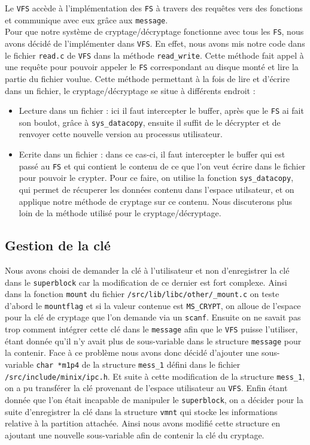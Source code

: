 \documentclass[10pt, onecolumn] {IEEEtran}
\begin{document}
Le \texttt{VFS} accède à l'implémentation des \texttt{FS} à travers des requêtes vers des fonctions et communique avec eux grâce aux \texttt{message}. \\

Pour que notre système de cryptage/décryptage fonctionne avec tous les \texttt{FS}, nous avons décidé de l'implémenter dans \texttt{VFS}. En effet, nous avons mis notre code dans le fichier \texttt{read.c} de \texttt{VFS} dans la méthode \texttt{read\_write}. Cette méthode fait appel à une requête pour pouvoir appeler le  \texttt{FS} correspondant au disque monté et lire la partie du fichier voulue. Cette méthode permettant à la fois de lire et d'écrire dans un fichier, le cryptage/décryptage se situe à différents endroit :

\begin{itemize}
\item Lecture dans un fichier : ici il faut intercepter le buffer, après que le \texttt{FS} ai fait son boulot, grâce à \texttt{sys\_datacopy}, ensuite il suffit de le décrypter et de renvoyer cette nouvelle version au processus utilisateur.
\item Ecrite dans un fichier : dans ce cas-ci, il faut intercepter le buffer qui est passé au \texttt{FS} et qui contient le contenu de ce que l'on veut écrire dans le fichier pour pouvoir le crypter. Pour ce faire, on utilise la fonction \texttt{sys\_datacopy}, qui permet de récuperer les données contenu dans l'espace utilsateur, et on applique notre méthode de cryptage sur ce contenu. Nous discuterons plus loin de la méthode utilisé pour le cryptage/décryptage.
\end{itemize}

\subsection{Gestion de la clé}

Nous avons choisi de demander la clé à l'utilisateur et non d'enregistrer la clé dans le \texttt{superblock} car la modification de ce dernier est fort complexe. Ainsi dans la fonction \texttt{mount} du fichier \texttt{/src/lib/libc/other/\_mount.c} on teste d'abord le \texttt{mountflag} et si la valeur contenue est \texttt{MS\_CRYPT}, on alloue de l'espace pour la clé de cryptage que l'on demande via un \texttt{scanf}. Ensuite on ne savait pas trop comment intégrer cette clé dans le \texttt{message} afin que le \texttt{VFS} puisse l'utiliser, étant donnée qu'il n'y avait plus de sous-variable dans le structure \texttt{message} pour la contenir. Face à ce problème nous avons donc décidé d'ajouter une sous-variable \texttt{char *m1p4} de la structure \texttt{mess\_1} défini dans le fichier \texttt{/src/include/minix/ipc.h}. Et suite à cette modification de la structure \texttt{mess\_1}, on a pu transférer la clé provenant de l'espace utilisateur au \texttt{VFS}. Enfin étant donnée que l'on était incapable de manipuler le \texttt{superblock}, on a décider pour la suite d'enregistrer la clé dans la structure \texttt{vmnt} qui stocke les informations relative à la partition attachée. Ainsi nous avons modifié cette structure en ajoutant une nouvelle sous-variable afin de contenir la clé du cryptage.     
\end{document}
